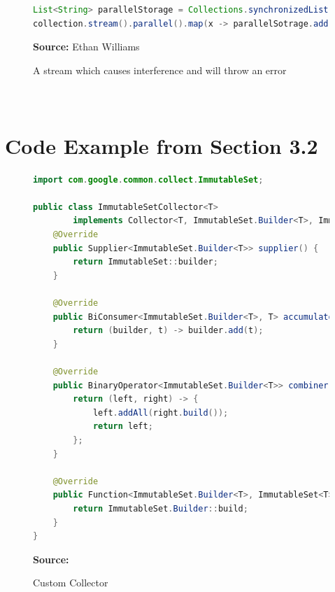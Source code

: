 \documentclass[oneside, 12pt]{article}
\newcommand{\source}[1]{\textbf{Source:} {#1} }
\begin{document}
\begin{figure}[H]
\centering
\begin{lstlisting}[language=Java]
List<String> parallelStorage = Collections.synchronizedList(new ArrayList<>());
collection.stream().parallel().map(x -> parallelSotrage.add(x)).forEachOrdered(x -> System.out.println(x));
\end{lstlisting}
\caption{A stream which causes interference and will throw an error}
\source{Ethan Williams}
\label{fig:stateful}
\end{figure}
 
\printbibliography[heading=bibintoc]

\appendix
\section{\\Code Example from Section 3.2}
\begin{figure}[H]
\centering
\begin{lstlisting}[language=Java]
import com.google.common.collect.ImmutableSet;
 
public class ImmutableSetCollector<T> 
        implements Collector<T, ImmutableSet.Builder<T>, ImmutableSet<T>> {
    @Override
    public Supplier<ImmutableSet.Builder<T>> supplier() {
        return ImmutableSet::builder;
    }
 
    @Override
    public BiConsumer<ImmutableSet.Builder<T>, T> accumulator() {
        return (builder, t) -> builder.add(t);
    }
 
    @Override
    public BinaryOperator<ImmutableSet.Builder<T>> combiner() {
        return (left, right) -> {
            left.addAll(right.build());
            return left;
        };
    }
 
    @Override
    public Function<ImmutableSet.Builder<T>, ImmutableSet<T>> finisher() {
        return ImmutableSet.Builder::build;
    }
}
\end{lstlisting}
\caption{Custom Collector }
\source{\autocite{custom_collector}}
\label{fig:collector_impl}
\end{figure}
\end{document}

